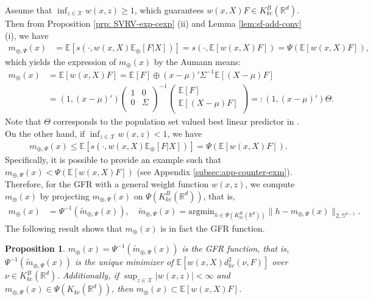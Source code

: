 \documentclass[11pt,reqno]{amsart}
\newtheorem{proposition}{Proposition}
\begin{document}
Assume that $\inf_{z \in \mathcal{X}}w(x,z) \geq 1$, which guarantees $w(x,X) F \in K_{kc}^B(\mathbb{R}^d)$. Then from  Proposition \ref{prp: SVRV-exp-cexp} (ii) and Lemma \ref{lem:sf-add-conv} (i), we have
\begin{align*}
m_{\oplus,\Psi}(x) 
&= \mathbb{E}[s(\cdot, w(x,X) \mathbb{E}_\oplus[F|X])]
= s(\cdot, \mathbb{E}[w(x,X)  F])
= \Psi(\mathbb{E}[w(x,X) F]),
\end{align*}
which yields the expression of $m_\oplus(x)$ by the Aumann means:
\begin{align*}
m_\oplus(x) 
&= \mathbb{E}[w(x,X) F] = \mathbb{E}[F] \oplus (x-\mu)'\Sigma^{-1}\mathbb{E}[(X-\mu)  F]\\
&= (1, (x-\mu)')\left(
\begin{array}{cc}
1 & 0 \\
0 & \Sigma \\
\end{array}\right)^{-1}\left(
\begin{array}{c}
\mathbb{E}[F]\\
\mathbb{E}[(X-\mu) F] \\
\end{array}\right) =:  (1, (x-\mu)')\Theta. 
\end{align*}
Note that $\Theta$ corresponds to the population set valued best linear predictor in \cite{BeMo08}. 
On the other hand, if $\inf_{z \in \mathcal{X}}w(x,z) < 1$, we have 
\begin{align}\label{ineq:GFR-BLP}
m_{\oplus,\Psi}(x) \leq \mathbb{E}[s(\cdot, w(x,X)\mathbb{E}_\oplus[F|X])] =  \Psi(\mathbb{E}[w(x,X)F]).
\end{align}
Specifically, it is possible to provide an example such that $m_{\oplus,\Psi}(x)< \Psi(\mathbb{E}[w(x,X)F])$ (see Appendix \ref{subsec:app-counter-exm}). Therefore, for the GFR with a general weight function $w(x,z)$, we compute $m_\oplus(x)$ by projecting $m_{\oplus,\Psi}(x)$ on $\Psi(K_{kc}^B(\mathbb{R}^d))$, that is, 
\begin{align*}
m_\oplus(x) &= \Psi^{-1}(\widetilde{m}_{\oplus,\Psi}(x)),\quad \widetilde{m}_{\oplus,\Psi}(x)= \mathrm{argmin}_{h \in \Psi(K_{kc}^B(\mathbb{R}^d))}\|h - m_{\oplus,\Psi}(x)\|_{2,\mathbb{S}^{d-1}}. 
\end{align*}
The following result shows that $m_\oplus(x)$ is in fact the GFR function.  
\begin{proposition}\label{prp:F-Reg-solution}
$m_\oplus(x)=\Psi^{-1}(\widetilde{m}_{\oplus,\Psi}(x))$ is the GFR function, that is, $\Psi^{-1}(\widetilde{m}_{\oplus,\Psi}(x))$ is the unique minimizer of $\mathbb{E}[w(x,X)d_{kc}^2(\nu,F)]$ over $\nu \in K_{kc}^B(\mathbb{R}^d)$. Additionally, if $\sup_{z \in \mathcal{X}}|w(x,z)|<\infty$ and $m_{\oplus,\Psi}(x) \in \Psi(K_{kc}(\mathbb{R}^d))$, then $m_\oplus(x) \subset \mathbb{E}[w(x,X)F]$. 
\end{proposition}
\end{document}
